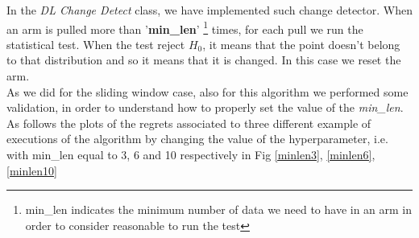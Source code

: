 In the \textit{DL Change Detect} class, we have implemented such change detector. When an arm is pulled more than '\textbf{min\_len}' \footnote{min\_len indicates the minimum number of data we need to have in an arm in order to consider reasonable to run the test} times, for each pull we run the statistical test. When the test reject $H_0$, it means that the point doesn't belong to that distribution and so it means that it is changed. In this case we reset the arm.\\
As we did for the sliding window case, also for this algorithm we performed some validation, in order to understand how to properly set the value of the \textit{min\_len}. As follows the plots of the regrets associated to three different example of executions of the algorithm by changing the value of the hyperparameter, i.e. with min\_len equal to 3, 6 and 10 respectively in Fig \ref{minlen3}, \ref{minlen6}, \ref{minlen10}

